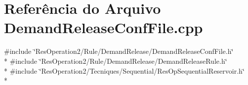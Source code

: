 \section{Referência do Arquivo Demand\+Release\+Conf\+File.\+cpp}
\label{_demand_release_conf_file_8cpp}
{\ttfamily \#include \char`\"{}Res\+Operation2/\+Rule/\+Demand\+Release/\+Demand\+Release\+Conf\+File.\+h\char`\"{}}\\*
{\ttfamily \#include \char`\"{}Res\+Operation2/\+Rule/\+Demand\+Release/\+Demand\+Release\+Rule.\+h\char`\"{}}\\*
{\ttfamily \#include \char`\"{}Res\+Operation2/\+Tecniques/\+Sequential/\+Res\+Op\+Sequential\+Reservoir.\+h\char`\"{}}\\*
